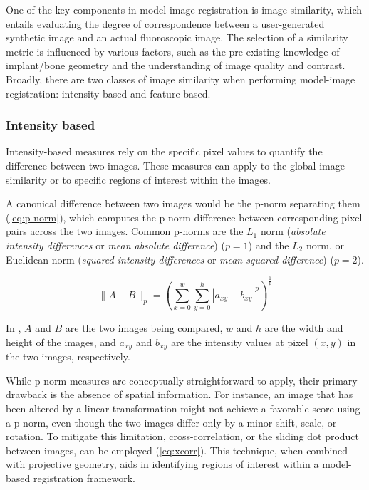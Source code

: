 One of the key components in model image registration is image similarity, which entails evaluating the degree of correspondence between a user-generated synthetic image and an actual fluoroscopic image.
The selection of a similarity metric is influenced by various factors, such as the pre-existing knowledge of implant/bone geometry and the understanding of image quality and contrast.
Broadly, there are two classes of image similarity when performing model-image registration: intensity-based and feature based.

\subsubsection{Intensity based}
\label{sec:img-sim-intensity}
Intensity-based measures rely on the specific pixel values to quantify the difference between two images.
These measures can apply to the global image similarity or to specific regions of interest within the images.

A canonical difference between two images would be the p-norm separating them (\cref{eq:p-norm}), which computes the p-norm difference between corresponding pixel pairs across the two images.
Common p-norms are the $L_1$ norm (\emph{absolute intensity differences} or \emph{mean absolute difference}) \cite{kanadeStereoMatchingAlgorithm1994} ($p=1$) and the $L_{2}$ norm, or Euclidean norm (\emph{squared intensity differences} or \emph{mean squared difference}) \cite{hannahComputerMatchingAreas1977}($p=2$).

\begin{equation}
    \|A-B\|_{p} = (\sum_{x=0}^{w}\sum_{y=0}^{h}|a_{xy}-b_{xy}|^{p})^{\frac{1}{p}}
    \label{eq:p-norm}
\end{equation}

In , $A$ and $B$ are the two images being compared, $w$ and $h$ are the width and height of the images, and $a_{xy}$ and $b_{xy}$ are the intensity values at pixel $(x,y)$ in the two images, respectively.

While p-norm measures are conceptually straightforward to apply, their primary drawback is the absence of spatial information.
For instance, an image that has been altered by a linear transformation might not achieve a favorable score using a p-norm, even though the two images differ only by a minor shift, scale, or rotation.
To mitigate this limitation, cross-correlation, or the sliding dot product between images, can be employed \cite{bendatRandomDataAnalysis2010,hannahComputerMatchingAreas1977} (\cref{eq:xcorr}).
This technique, when combined with projective geometry, aids in identifying regions of interest within a model-based registration framework.

